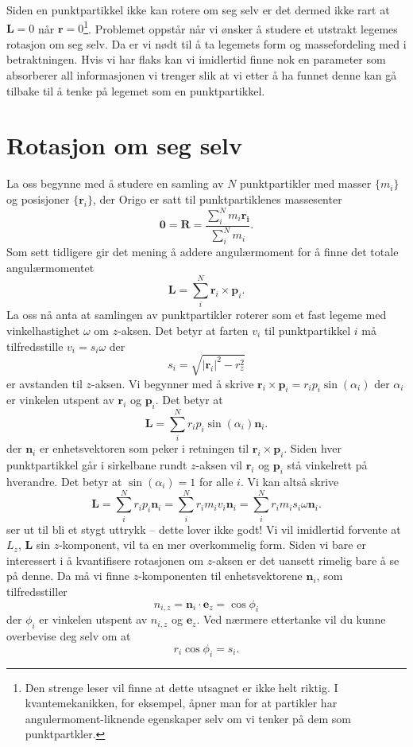 \documentclass[twoside,utf8]{article}
\begin{document}
Siden en punktpartikkel ikke kan rotere om seg selv er det dermed ikke rart at $\mathbf{L}=0$ når $\mathbf{r}=0$\footnote{Den strenge leser vil finne at dette utsagnet er ikke helt riktig. I kvantemekanikken, for eksempel, åpner man for at partikler har angulermoment-liknende egenskaper selv om vi tenker på dem som punktpartkler. }. Problemet oppstår når vi ønsker å studere et utstrakt legemes rotasjon om seg selv. Da er vi nødt til å ta legemets form og massefordeling med i betraktningen. Hvis vi har flaks kan vi imidlertid finne nok en parameter som absorberer all informasjonen vi trenger slik at vi etter å ha funnet denne kan gå tilbake til å tenke på legemet som en punktpartikkel.



\section{Rotasjon om seg selv}
La oss begynne med å studere en samling av $N$ punktpartikler med masser $\{m_i\}$ og posisjoner $\{\mathbf{r}_i\}$, der Origo er satt til punktpartiklenes massesenter
\[
\mathbf{0}=\mathbf{R}=\frac{\sum_i^N m_i\mathbf{r_i}}{\sum_i^N m_i}.
\]
Som sett tidligere gir det mening å addere angulærmoment for å finne det totale angulærmomentet
\[
\mathbf{L} = \sum_i^N \mathbf{r}_i \times \mathbf{p}_i.
\]
La oss nå anta at samlingen av punktpartikler roterer som et fast legeme med vinkelhastighet $\omega$ om $z$-aksen. Det betyr at farten $v_i$ til punktpartikkel $i$ må tilfredsstille $v_i = s_i \omega$ der
\[
s_i = \sqrt{ |\mathbf{r}_i|^2 - r_z^2 }
\]
er avstanden til $z$-aksen. Vi begynner med å skrive $\mathbf{r}_i\times \mathbf{p}_i = r_i p_i \sin(\alpha_i)$ der $\alpha_i$ er vinkelen utspent av $\mathbf{r}_i$ og $\mathbf{p}_i$. Det betyr at
\[
\mathbf{L} = \sum_i^N r_i p_i \sin(\alpha_i) \mathbf{n}_i.
\]
der $\mathbf{n}_i$ er enhetsvektoren som peker i retningen til $\mathbf{r}_i\times\mathbf{p}_i$. Siden hver punktpartikkel går i sirkelbane rundt $z$-aksen vil $\mathbf{r}_i$ og $\mathbf{p}_i$ stå vinkelrett på hverandre. Det betyr at $\sin(\alpha_i)=1$ for alle $i$. Vi kan altså skrive
\[
\mathbf{L}
= \sum_i^N r_i p_i  \mathbf{n}_i
= \sum_i^N r_i m_i v_i  \mathbf{n}_i
= \sum_i^N r_i m_i s_i \omega  \mathbf{n}_i.
\]
 ser ut til bli et stygt uttrykk -- dette lover ikke godt! Vi vil imidlertid forvente at $L_z$, $\mathbf{L}$ sin $z$-komponent, vil ta en mer overkommelig form. Siden vi bare er interessert i å kvantifisere rotasjonen om $z$-aksen er det uansett rimelig bare å se på denne. Da må vi finne $z$-komponenten til enhetsvektorene $\mathbf{n}_i$, som tilfredsstiller
\[
n_{i,z} = \mathbf{n}_i \cdot \mathbf{e}_z = \cos \phi_i
\]
der $\phi_i$ er vinkelen utspent av $n_{i,z}$ og $\mathbf{e}_z$. Ved nærmere ettertanke vil du kunne overbevise deg selv om at
\[
r_i \cos \phi_i = s_i.
\]
\end{document}
